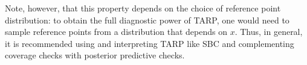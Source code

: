 \documentclass{aa}
\begin{document}
\begin{appendix}
Note, however, that this property depends on the choice of reference point distribution: to obtain the full diagnostic power of TARP, one would need to sample reference points from a distribution that depends on $x$. Thus, in general, it is recommended using and interpreting TARP like SBC and complementing coverage checks with posterior predictive checks.

\end{appendix}
\end{document}
